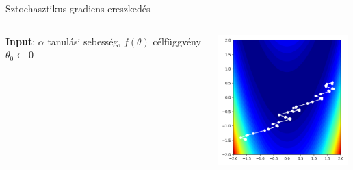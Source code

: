 \documentclass[english, aspectratio=169]{beamer}
\begin{document}
\begin{frame}{Sztochasztikus gradiens ereszkedés}
\begin{columns}
\begin{column}{.7\textwidth}
\begin{algorithm}[H]
\caption{Sztochasztikus gradiens ereszkedés}
\SetAlgoLined
\textbf{Input}: $\alpha$ tanulási sebesség, $f(\theta)$ célfüggvény\\
$\theta_0 \leftarrow 0$ 
\end{algorithm}
\end{column}
\begin{column}{.3\textwidth}
\begin{center}
\includegraphics[height=5cm, width=5cm, keepaspectratio]{images/gd_stochastic.png}
\end{center}
\end{column}
\end{columns}
\end{frame}
\end{document}
